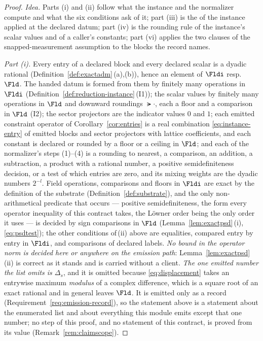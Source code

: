 \begin{proof}
\emph{Idea.} Parts (i) and (ii) follow what the instance and the normalizer
compute and what the six conditions ask of it; part (iii) is the
 of the instance applied at the declared datum; part
(iv) is the rounding rule of the instance's scalar values and of a caller's
constants; part (vi) applies the two clauses of the snapped-measurement
assumption to the blocks the record names.

\emph{Part (i).} Every entry of a declared block and every declared scalar is
a dyadic rational (Definition~\ref{def:exactadm}\,(a),(b)), hence an element
of $\Fldi$ resp.\ $\Fld$. The handed datum is formed from them by finitely
many operations in $\Fldi$ (Definition~\ref{def:reduction-instance}\,(I1));
the scalar values by finitely many operations in $\Fld$ and downward
roundings $\lat{\cdot}$, each a floor and a comparison in $\Fld$ (I2); the
sector projectors are the indicator values $0$ and $1$; each emitted
constraint operator of Corollary~\ref{cor:entries} is a real combination
\eqref{eq:instance-entry} of emitted blocks and sector projectors with
lattice coefficients, and each constant is declared or rounded by a floor or
a ceiling in $\Fld$; and each of the normalizer's steps (1)--(4) is a
rounding to nearest, a comparison, an addition, a subtraction, a product
with a rational number, a positive semidefiniteness decision, or a test of
which entries are zero, and its mixing weights are the dyadic numbers
$2^{-l}$. Field operations, comparisons and floors in $\Fldi$ are exact by the
definition of the substrate (Definition~\ref{def:substrate}), and the only
non-arithmetical predicate that occurs --- positive semidefiniteness, the
form every operator inequality of this contract takes, the L\"owner order
being the only order it uses --- is decided by sign comparisons in $\Fld$
(Lemma~\ref{lem:exactpsd}\,(i), \eqref{eq:psdtest}); the other conditions
of\,(ii) above are equalities, compared entry by entry in $\Fldi$, and
comparisons of declared labels. \emph{No bound in the operator norm is decided
here or anywhere on the emission path}: Lemma~\ref{lem:exactpsd}\,(ii) is
correct as it stands and is carried without a client. \emph{The one emitted
number the list omits is $\Delta_s$}, and it is omitted because
\eqref{eq:displacement} takes an entrywise maximum \emph{modulus} of a complex
difference, which is a square root of an exact rational and in general leaves
$\Fld$. It is emitted only as a record
(Requirement~\ref{req:emission-record}), so the statement above is a
statement about the enumerated list and about everything this module emits
except that one number; no step of this proof, and no statement of this
contract, is proved from its value (Remark~\ref{rem:claimscope}).


\end{proof}
